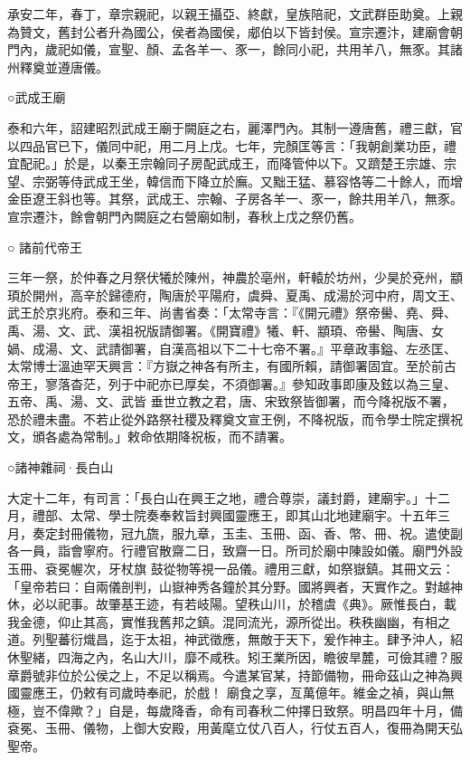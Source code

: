 \begin{pinyinscope}
 承安二年，春丁，章宗親祀，以親王攝亞、終獻，皇族陪祀，文武群臣助奠。上親為贊文，舊封公者升為國公，侯者為國侯，郕伯以下皆封侯。宣宗遷汴，建廟會朝門內，歲祀如儀，宣聖、顏、孟各羊一、豕一，餘同小祀，共用羊八，無豕。其諸
 州釋奠並遵唐儀。



 ○武成王廟



 泰和六年，詔建昭烈武成王廟于闕庭之右，麗澤門內。其制一遵唐舊，禮三獻，官以四品官已下，儀同中祀，用二月上戊。七年，完顏匡等言：「我朝創業功臣，禮宜配祀。」於是，以秦王宗翰同子房配武成王，而降管仲以下。又躋楚王宗雄、宗望、宗弼等侍武成王坐，韓信而下降立於廡。又黜王猛、慕容恪等二十餘人，而增金臣遼王斜也等。其祭，武成王、宗翰、子房各羊一、豕一，餘共用羊八，無豕。宣宗遷汴，餘會朝門內闕庭之右營廟如制，春秋上戊之祭仍舊。



 ○
 諸前代帝王



 三年一祭，於仲春之月祭伏犧於陳州，神農於亳州，軒轅於坊州，少昊於兗州，顓頊於開州，高辛於歸德府，陶唐於平陽府，虞舜、夏禹、成湯於河中府，周文王、武王於京兆府。泰和三年、尚書省奏：「太常寺言：『《開元禮》祭帝嚳、堯、舜、禹、湯、文、武、漢祖祝版請御署。《開寶禮》犧、軒、顓頊、帝嚳、陶唐、女媧、成湯、文、武請御署，自漢高祖以下二十七帝不署。』平章政事鎰、左丞匡、太常博士溫迪罕天興言：『方嶽之神各有所主，有國所賴，請御署固宜。至於前古帝王，寥落杳茫，列于中祀亦已厚矣，不須御署。』參知政事即康及鉉以為三皇、五帝、禹、湯、文、武皆
 垂世立教之君，唐、宋致祭皆御署，而今降祝版不署，恐於禮未盡。不若止從外路祭社稷及釋奠文宣王例，不降祝版，而令學士院定撰祝文，頒各處為常制。」敕命依期降祝板，而不請署。



 ○諸神雜祠·長白山



 大定十二年，有司言：「長白山在興王之地，禮合尊崇，議封爵，建廟宇。」十二月，禮部、太常、學士院奏奉敕旨封興國靈應王，即其山北地建廟宇。十五年三月，奏定封冊儀物，冠九旒，服九章，玉圭、玉冊、函、香、幣、冊、祝。遣使副各一員，詣會寧府。行禮官散齋二日，致齋一日。所司於廟中陳設如儀。廟門外設玉冊、袞冕幄次，牙杖旗
 鼓從物等視一品儀。禮用三獻，如祭嶽鎮。其冊文云：「皇帝若曰：自兩儀剖判，山嶽神秀各鐘於其分野。國將興者，天實作之。對越神休，必以祀事。故肇基王迹，有若岐陽。望秩山川，於稽虞《典》。厥惟長白，載我金德，仰止其高，實惟我舊邦之鎮。混同流光，源所從出。秩秩幽幽，有相之道。列聖蕃衍熾昌，迄于太祖，神武徵應，無敵于天下，爰作神主。肆予沖人，紹休聖緒，四海之內，名山大川，靡不咸秩。矧王業所因，瞻彼旱麓，可儉其禮？服章爵號非位於公侯之上，不足以稱焉。今遣某官某，持節備物，冊命茲山之神為興國靈應王，仍敕有司歲時奉祀，於戲！
 廟食之享，亙萬億年。維金之禎，與山無極，豈不偉歟？」自是，每歲降香，命有司春秋二仲擇日致祭。明昌四年十月，備袞冕、玉冊、儀物，上御大安殿，用黃麾立仗八百人，行仗五百人，復冊為開天弘聖帝。




\end{pinyinscope}
